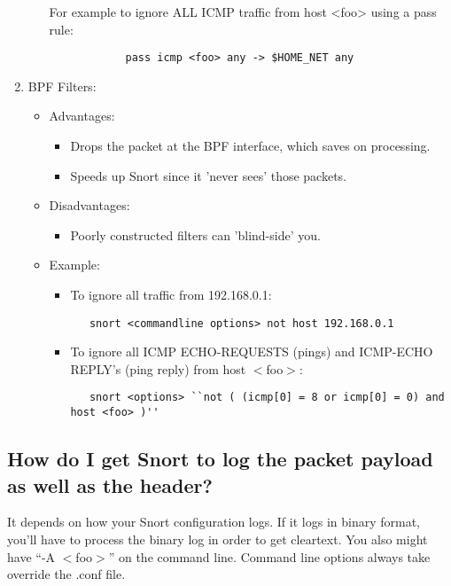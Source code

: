 \documentclass{article}
\begin{document}
\begin{enumerate}
\begin{itemize}
        For example to ignore ALL ICMP traffic from host <foo> using a pass
        rule:
		\begin{verbatim}
            pass icmp <foo> any -> $HOME_NET any
	    	\end{verbatim}
    \end{itemize}
\item  BPF Filters:
      \begin{itemize}
      \item Advantages:
      	\begin{itemize}
        \item Drops the packet at the BPF interface, which saves on processing.
        \item Speeds up Snort since it 'never sees' those packets.
	\end{itemize}
      \item Disadvantages:
      	\begin{itemize}
        \item Poorly constructed filters can 'blind-side' you.
	\end{itemize}
      \item Example:
      \begin{itemize}
       \item To ignore all traffic from 192.168.0.1:
	\begin{verbatim}
   snort <commandline options> not host 192.168.0.1
    	\end{verbatim}
       \item To ignore all ICMP ECHO-REQUESTS (pings) and ICMP-ECHO REPLY's (ping
        reply) from host $<$foo$>$:
	\begin{verbatim}
   snort <options> ``not ( (icmp[0] = 8 or icmp[0] = 0) and host <foo> )''
        \end{verbatim}
	\end{itemize}
    \end{itemize}
\end{enumerate}

\subsection{How do I get Snort to log the packet payload as well as the header?}

It depends on how your Snort configuration logs. If it logs in binary format,
you'll have to process the binary log in order to get cleartext. You also might
have ``-A $<$foo$>$'' on the command line. Command line options always take
override the .conf file.  
\end{document}
